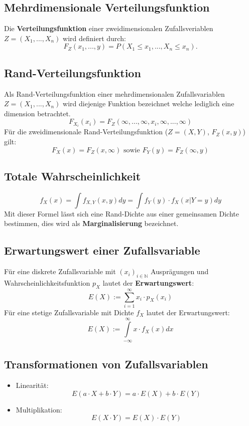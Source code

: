 \documentclass[12pt]{article}
\begin{document}
\subsection{Mehrdimensionale Verteilungsfunktion}
Die \textbf{Verteilungsfunktion} einer zweidimensionalen Zufallsveriablen $Z = (X_1,...,X_n)$ wird definiert durch:
\begin{equation}
	F_Z(x_1,...,y)=P(X_1\leq x_1,..., X_n\leq x_n).
\end{equation}
\subsection{Rand-Verteilungsfunktion}
Als Rand-Verteilungsfunktion einer mehrdimensionalen Zufallsvariablen $Z=(X_1,...,X_n)$ wird diejenige Funktion bezeichnet welche lediglich eine dimension betrachtet.
\begin{equation}
	F_{X_i}(x_i)=F_Z(\infty,...,\infty,x_i,\infty,...,\infty)
\end{equation}
Für die zweidimensionale Rand-Verteilungsfunktion ($Z=(X,Y)$, $F_Z(x,y)$) gilt:
\begin{equation}
	F_X(x)=F_Z(x,\infty) \text{ sowie } F_Y(y) = F_Z(\infty,y)
\end{equation}
\subsection{Totale Wahrscheinlichkeit}
\begin{equation}
	f_X(x) = \int f_{X,Y}(x,y)dy = \int f_Y(y) \cdot f_X(x|Y=y) dy
\end{equation}
Mit dieser Formel lässt sich eine Rand-Dichte aus einer gemeinsamen Dichte bestimmen, dies wird als \textbf{Marginalisierung} bezeichnet.
\subsection{Erwartungswert einer Zufallsvariable}
Für eine diskrete Zufallsvariable mit $(x_i)_{i\in \mathbb{N}}$ Ausprägungen und Wahrscheinlichkeitsfunktion $p_X$ lautet der \textbf{Erwartungswert}:
\begin{equation}
	E(X):=\sum\limits_{i=1}^\infty x_i\cdot p_X(x_i)
\end{equation}
Für eine stetige Zufallsvariable mit Dichte $f_X$ lautet der Erwartungswert:
\begin{equation}
	E(X):=\int\limits_{-\infty}^\infty x\cdot f_X(x) dx
\end{equation}
\subsection{Transformationen von Zufallsvariablen}
\begin{itemize}
	\item Linearität:
	\begin{equation}
		E(a\cdot X + b\cdot Y)=a\cdot E(X)+b\cdot E(Y)
	\end{equation}
	\item Multiplikation:
	\begin{equation}
		E(X\cdot Y) = E(X)\cdot E(Y)
	\end{equation}
\end{itemize}
\end{document}
